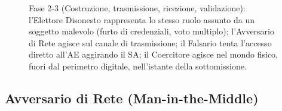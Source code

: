 \begin{figure}[H]
{%
    }
    \caption{Fase 2-3 (Costruzione, trasmissione, ricezione, validazione): l'Elettore Disonesto rappresenta lo stesso ruolo assunto da un soggetto malevolo (furto di credenziali, voto multiplo); l'Avversario di Rete agisce sul canale di trasmissione; il Falsario tenta l'accesso diretto all'AE aggirando il SA; il Coercitore agisce nel mondo fisico, fuori dal perimetro digitale, nell'istante della sottomissione.}
    \label{fig:minacce_fase23}
\end{figure}

\subsection{Avversario di Rete (Man-in-the-Middle)}
\label{subsec:3.2.1_mitm}

